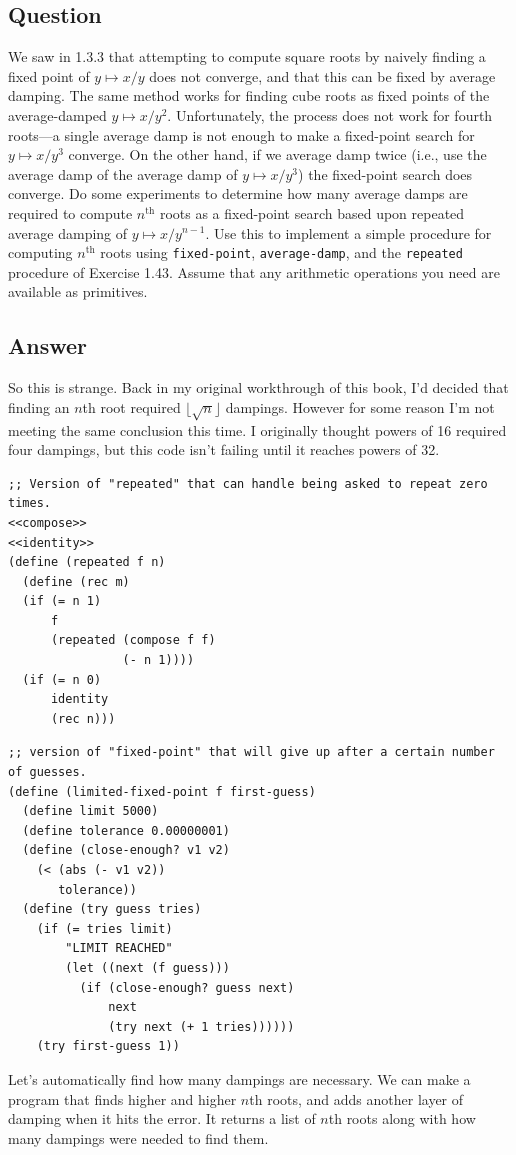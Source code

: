 \documentclass[final,fleqn,titlepage]{article}
\begin{document}
\subsection{Question}
\label{sec:orga61af4b}
We saw in 1.3.3 that attempting to compute square roots by naively finding a
fixed point of \(y \mapsto x / y\) does not converge, and that this can be fixed by
average damping. The same method works for finding cube roots as fixed points of
the average-damped \(y \mapsto x / y^2\). Unfortunately, the process does not work for
fourth roots---a single average damp is not enough to make a fixed-point search
for \(y \mapsto x / y^3\) converge. On the other hand, if we average damp twice (i.e.,
use the average damp of the average damp of \(y \mapsto x / y^3\)) the fixed-point
search does converge. Do some experiments to determine how many average damps
are required to compute \(n^{\mathrm{th}}\) roots as a fixed-point search based
upon repeated average damping of \(y \mapsto x / y^{n-1}\). Use this to implement a
simple procedure for computing \(n^{\mathrm{th}}\) roots using \texttt{fixed-point},
\texttt{average-damp}, and the \texttt{repeated} procedure of Exercise 1.43. Assume that any
arithmetic operations you need are available as primitives.
\subsection{Answer}
\label{sec:org8e37078}
So this is strange. Back in my original workthrough of this book, I'd decided
that finding an \(n\)th root required \(\lfloor\sqrt{n}\rfloor\) dampings.
However for some reason I'm not meeting the same conclusion this time. I
originally thought powers of 16 required four dampings, but this code isn't
failing until it reaches powers of 32.
\begin{verbatim}
;; Version of "repeated" that can handle being asked to repeat zero times.
<<compose>>
<<identity>>
(define (repeated f n)
  (define (rec m)
  (if (= n 1)
      f
      (repeated (compose f f)
                (- n 1))))
  (if (= n 0)
      identity
      (rec n)))
\end{verbatim}
\begin{verbatim}
;; version of "fixed-point" that will give up after a certain number of guesses.
(define (limited-fixed-point f first-guess)
  (define limit 5000)
  (define tolerance 0.00000001)
  (define (close-enough? v1 v2)
    (< (abs (- v1 v2)) 
       tolerance))
  (define (try guess tries)
    (if (= tries limit)
        "LIMIT REACHED"
        (let ((next (f guess)))
          (if (close-enough? guess next)
              next
              (try next (+ 1 tries))))))
    (try first-guess 1))
\end{verbatim}
Let's automatically find how many dampings are necessary. We can make a program that finds higher and higher \(n\)th roots, and adds another layer of damping when it hits the error. It returns a list of \(n\)th roots along with how many dampings were needed to find them.
\end{document}
